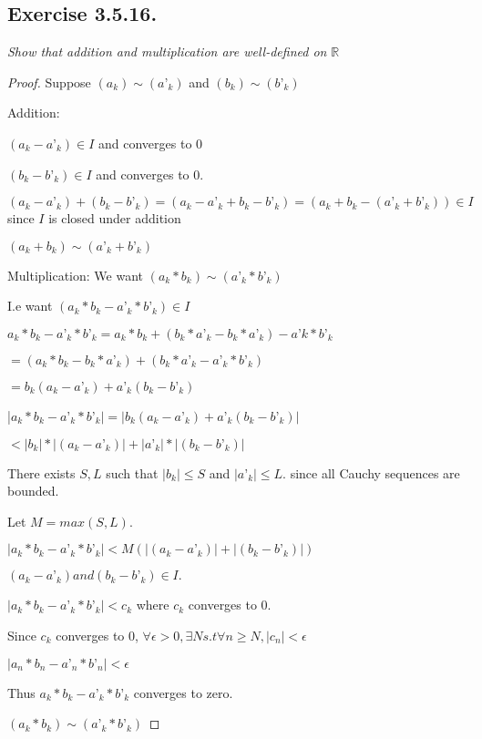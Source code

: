 \documentclass[12pt, a4paper]{article}
\begin{document}
    \subsection*{Exercise 3.5.16.}
        \textit{Show that addition and multiplication are well-defined on} $\mathbb{R}$
        \begin{proof}
            Suppose $(a_k)\sim (a’_k)$ and $(b_k)\sim (b’_k)$

            Addition:

            $(a_k-a’_k) \in I$ and converges to 0

            $(b_k - b’_k) \in I$ and converges to 0. 

            $(a_k-a’_k) + (b_k - b’_k) = (a_k-a’_k + b_k - b’_k) = (a_k+b_k - (a’_k+b’_k)) \in I$ since $I$ is closed under addition

            $(a_k+b_k ) \sim (a’_k+b’_k)$

            Multiplication: We want $(a_k*b_k) \sim (a’_k * b’_k)$

            I.e want $(a_k*b_k-a’_k * b’_k) \in I$

            $a_k*b_k-a’_k * b’_k = a_k*b_k+(b_k*a’_k - b_k*a’_k) - a’k*b’_k$

            $= (a_k*b_k - b_k*a’_k) + (b_k*a’_k - a’_k*b’_k)$

            $=b_k(a_k-a’_k) + a’_k(b_k-b’_k)$

            |$a_k*b_k-a’_k * b’_k| = | b_k(a_k-a’_k) + a’_k(b_k-b’_k)|$

            $< | b_k|*|(a_k-a’_k)|+ |a’_k|*|(b_k-b’_k)|$

            There exists $S,L$ such that $|b_k| \le S$ and $|a’_k| \le L.$ since all Cauchy sequences are bounded. 

            Let $M = max(S,L).$ 

            $|a_k*b_k-a’_k * b’_k| < M(|(a_k-a’_k)|+ |(b_k-b’_k)|)$ 

            $(a_k-a’_k) and (b_k-b’_k) \in I.$

            $|a_k*b_k-a’_k * b’_k| < c_k$ where $c_k$ converges to 0.

            Since $c_k$ converges to 0, $\forall \epsilon > 0, \exists N s.t \forall n\ge N, |c_n| < \epsilon$

            $|a_n*b_n-a’_n * b’_n| < \epsilon$ 

            Thus $a_k*b_k-a’_k * b’_k$ converges to zero.

            $(a_k*b_k) \sim (a’_k * b’_k)$
        \end{proof}
\end{document}
